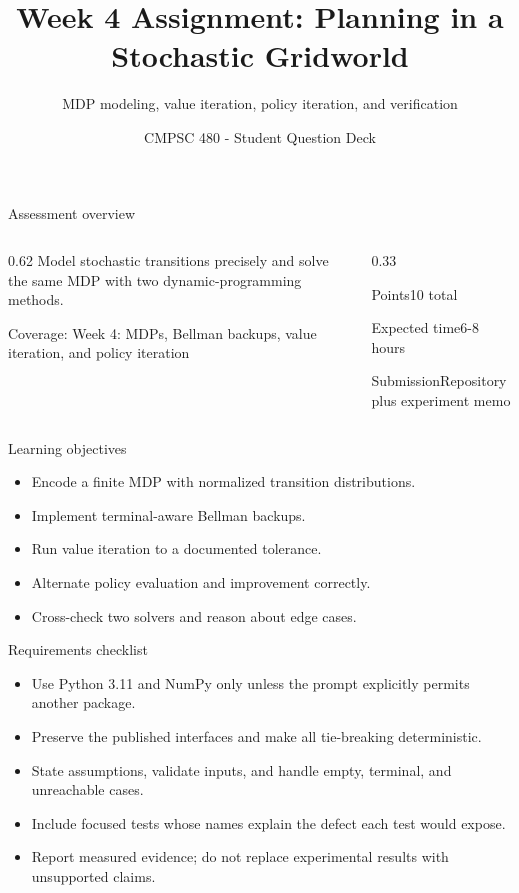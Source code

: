 \documentclass[aspectratio=169,11pt]{beamer}
\title[Week 4 Assignment Questions]{Week 4 Assignment: Planning in a Stochastic Gridworld}
\subtitle{MDP modeling, value iteration, policy iteration, and verification}
\author{CMPSC 480 - Student Question Deck}
\date{}
\begin{document}
\begin{frame}
  \titlepage
\end{frame}

\begin{frame}{Assessment overview}
\begin{columns}[T,onlytextwidth]
\begin{column}{0.62\textwidth}
\Large Model stochastic transitions precisely and solve the same MDP with two dynamic-programming methods.

\vspace{0.35cm}
\normalsize
Coverage: Week 4: MDPs, Bellman backups, value iteration, and policy iteration
\end{column}
\begin{column}{0.33\textwidth}
\begin{block}{Points}10 total\end{block}
\begin{block}{Expected time}6-8 hours\end{block}
\begin{block}{Submission}Repository plus experiment memo\end{block}
\end{column}
\end{columns}
\end{frame}

\begin{frame}{Learning objectives}
\begin{itemize}
  \item Encode a finite MDP with normalized transition distributions.
  \item Implement terminal-aware Bellman backups.
  \item Run value iteration to a documented tolerance.
  \item Alternate policy evaluation and improvement correctly.
  \item Cross-check two solvers and reason about edge cases.
\end{itemize}
\end{frame}

\begin{frame}{Requirements checklist}
\small
\begin{itemize}
  \item Use Python 3.11 and NumPy only unless the prompt explicitly permits another package.
  \item Preserve the published interfaces and make all tie-breaking deterministic.
  \item State assumptions, validate inputs, and handle empty, terminal, and unreachable cases.
  \item Include focused tests whose names explain the defect each test would expose.
  \item Report measured evidence; do not replace experimental results with unsupported claims.
\end{itemize}
\end{frame}
\end{document}
